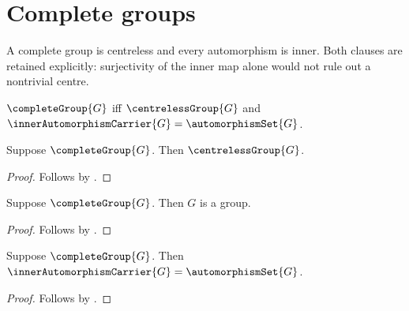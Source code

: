 

\section{Complete groups}

A complete group is centreless and every automorphism is inner.  Both clauses
are retained explicitly: surjectivity of the inner map alone would not rule
out a nontrivial centre.

\begin{definition}\label{complete_group}
    $\completeGroup{G}$ iff
        $\centrelessGroup{G}$ and
        $\innerAutomorphismCarrier{G}=\automorphismSet{G}$.
\end{definition}

\begin{proposition}\label{complete_group_is_centreless}
    Suppose $\completeGroup{G}$.
    Then $\centrelessGroup{G}$.
\end{proposition}
\begin{proof}
    Follows by .
\end{proof}

\begin{corollary}\label{complete_group_is_group}
    Suppose $\completeGroup{G}$.
    Then $G$ is a group.
\end{corollary}
\begin{proof}
    Follows by
        .
\end{proof}

\begin{proposition}\label{complete_group_all_automorphisms_inner}
    Suppose $\completeGroup{G}$.
    Then $\innerAutomorphismCarrier{G}=\automorphismSet{G}$.
\end{proposition}
\begin{proof}
    Follows by .
\end{proof}

